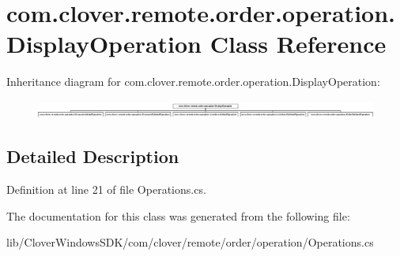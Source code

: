 \hypertarget{classcom_1_1clover_1_1remote_1_1order_1_1operation_1_1_display_operation}{}\section{com.\+clover.\+remote.\+order.\+operation.\+Display\+Operation Class Reference}
\label{classcom_1_1clover_1_1remote_1_1order_1_1operation_1_1_display_operation}
Inheritance diagram for com.\+clover.\+remote.\+order.\+operation.\+Display\+Operation\+:\begin{figure}[H]
\begin{center}
\leavevmode
\includegraphics[height=0.597333cm]{classcom_1_1clover_1_1remote_1_1order_1_1operation_1_1_display_operation}
\end{center}
\end{figure}


\subsection{Detailed Description}


Definition at line 21 of file Operations.\+cs.



The documentation for this class was generated from the following file\+:\begin{DoxyCompactItemize}
\item 
lib/\+Clover\+Windows\+S\+D\+K/com/clover/remote/order/operation/Operations.\+cs\end{DoxyCompactItemize}
